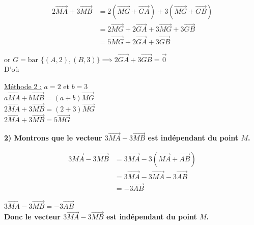 \documentclass{article}
\begin{document}
\vspace{1em}

\begin{align*}
    2 \overrightarrow{MA} + 3 \overrightarrow{MB} &= 2 (\overrightarrow{MG} + \overrightarrow{GA}) + 3 (\overrightarrow{MG} + \overrightarrow{GB}) \\
    &= 2 \overrightarrow{MG} + 2 \overrightarrow{GA} + 3 \overrightarrow{MG} + 3 \overrightarrow{GB} \\
    &= 5 \overrightarrow{MG} + 2 \overrightarrow{GA} + 3 \overrightarrow{GB}
\end{align*}

\vspace{1.5em}

\noindent or $G = \text{bar } \{(A, 2), (B, 3)\} \implies 2 \overrightarrow{GA} + 3 \overrightarrow{GB} = \vec{0}$ \\
D'où 
\begin{center}
\end{center}

\noindent \underline{Méthode 2 :} $a = 2$ et $b = 3$ \\
$a \overrightarrow{MA} + b \overrightarrow{MB} = (a + b) \overrightarrow{MG}$ \\
$2 \overrightarrow{MA} + 3 \overrightarrow{MB} = (2 + 3) \overrightarrow{MG}$ \\
$2 \overrightarrow{MA} + 3 \overrightarrow{MB} = 5 \overrightarrow{MG}$

\vspace{2em}

\noindent \textbf{2) Montrons que le vecteur $3 \overrightarrow{MA} - 3 \overrightarrow{MB}$ est indépendant du point $M$.}

\vspace{1em}

\begin{align*}
    3 \overrightarrow{MA} - 3 \overrightarrow{MB} &= 3 \overrightarrow{MA} - 3 (\overrightarrow{MA} + \overrightarrow{AB}) \\
    &= 3 \overrightarrow{MA} - 3 \overrightarrow{MA} - 3 \overrightarrow{AB} \\
    &= -3 \overrightarrow{AB}
\end{align*}

\vspace{1em}

\noindent $3 \overrightarrow{MA} - 3 \overrightarrow{MB} = -3 \overrightarrow{AB}$ \\
\textbf{Donc le vecteur $3 \overrightarrow{MA} - 3 \overrightarrow{MB}$ est indépendant du point $M$.}
\end{document}

